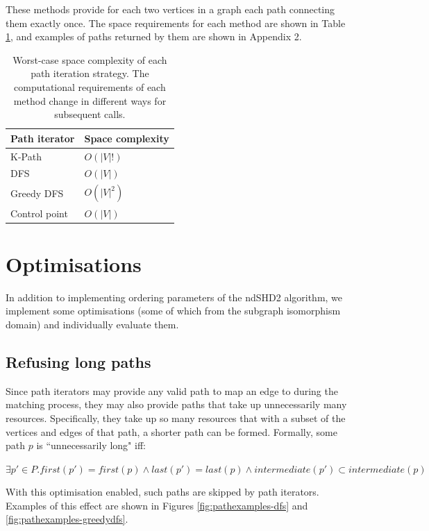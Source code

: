 These methods provide for each two vertices in a graph each path connecting them exactly once. The space requirements for each method are shown in Table \ref{tab:iterator-spacerequirements}, and examples of paths returned by them are shown in Appendix 2.

\begin{table}[]
\centering
\begin{tabular}{|l|l|}
\hline
\textbf{Path iterator} & \textbf{Space complexity} \\ \hline
K-Path                 & $O(|V|!)$                 \\ \hline
DFS                    & $O(|V|)$                  \\ \hline
Greedy DFS             & $O(|V|^2)$                \\ \hline
Control point          & $O(|V|)$                  \\ \hline
\end{tabular}
\caption{Worst-case space complexity of each path iteration strategy. The computational requirements of each method change in different ways for subsequent calls.}
\label{tab:iterator-spacerequirements}
\end{table}


\section{Optimisations}
In addition to implementing ordering parameters of the ndSHD2 algorithm, we implement some optimisations (some of which from the subgraph isomorphism domain) and individually evaluate them. 

\subsection{Refusing long paths}
Since path iterators may provide any valid path to map an edge to during the matching process, they may also provide paths that take up unnecessarily many resources. Specifically, they take up so many resources that with a subset of the vertices and edges of that path, a shorter path can be formed. Formally, some path $p$ is ``unnecessarily long" iff:


$\exists p' \in P . first(p') = first(p) \land last(p') = last(p) \land intermediate(p') \subset intermediate(p)$

With this optimisation enabled, such paths are skipped by path iterators. Examples of this effect are shown in Figures \ref{fig:pathexamples-dfs} and \ref{fig:pathexamples-greedydfs}.

